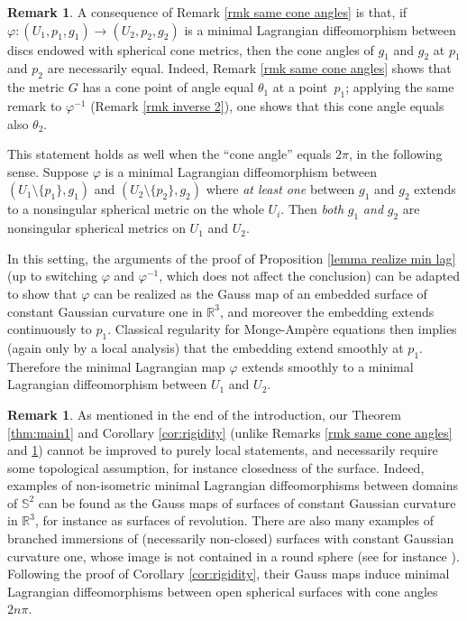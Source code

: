 \documentclass[11pt]{article}
\theoremstyle{definition}
\newtheorem{remark}[cor]{Remark}
\newcommand{\R}{{\mathbb R}}
\begin{document}
\begin{remark}\label{rmk extend}
A consequence of Remark \ref{rmk same cone angles} is that, if $\varphi:(U_1,p_1,g_1)\to (U_2,p_2,g_2)$ is a minimal Lagrangian diffeomorphism between discs endowed with spherical cone metrics, then the cone angles of $g_1$ and $g_2$ at $p_1$ and $p_2$ are necessarily equal. Indeed, Remark \ref{rmk same cone angles} shows that the metric $G$ has a cone point of angle equal $\theta_1$ at a point~$p_1$; applying the same remark to $\varphi^{-1}$ (Remark \ref{rmk inverse 2}), one shows that this cone angle equals also $\theta_2$.

This statement holds as well when the ``cone angle'' equals $2\pi$, in the following sense. Suppose $\varphi$ is a minimal Lagrangian diffeomorphism between $(U_1\setminus\{p_1\},g_1)$ and $(U_2\setminus\{p_2\},g_2)$ where \emph{at least one} between $g_1$ and $g_2$ extends to a nonsingular spherical metric on the whole $U_i$. Then \emph{both} $g_1$ \emph{and} $g_2$ are nonsingular spherical metrics on $U_1$ and $U_2$.

In this setting, the arguments of the proof of Proposition \ref{lemma realize min lag} (up to switching $\varphi$ and $\varphi^{-1}$, which does not affect the conclusion) can be adapted to show that $\varphi$ can be realized as the Gauss map of an embedded surface of constant Gaussian curvature one in $\R^3$, and moreover the embedding extends continuously to $p_1$. Classical regularity for Monge-Ampère equations then implies (again only by a local analysis) that the embedding extend smoothly at $p_1$. Therefore the minimal Lagrangian map $\varphi$ extends smoothly to a minimal Lagrangian diffeomorphism between $U_1$ and $U_2$.
\end{remark}

\begin{remark}
As mentioned in the end of the introduction, our Theorem \ref{thm:main1} and Corollary \ref{cor:rigidity} (unlike Remarks \ref{rmk same cone angles} and \ref{rmk extend}) cannot be improved to purely local statements, and necessarily require some topological assumption, for instance closedness of the surface. Indeed, examples of non-isometric minimal Lagrangian diffeomorphisms between domains of $\mathbb S^2$ can be found as the Gauss maps of surfaces of constant Gaussian curvature in $\R^3$, for instance as surfaces of revolution. There are also many examples of branched immersions of (necessarily non-closed) surfaces with constant Gaussian curvature one, whose image is not contained in a round sphere (see for instance \cite{zbMATH06599450}). Following the proof of Corollary \ref{cor:rigidity}, their Gauss maps induce minimal Lagrangian diffeomorphisms between open spherical surfaces with cone angles~$2n\pi$.
\end{remark}
\end{document}
